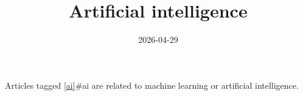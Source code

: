 \documentclass{note}
\title{Artificial intelligence}
\date{2026-04-29}
\begin{document}
Articles tagged \ref{ai}{#ai} are related to machine learning or artificial intelligence.
\end{document}
